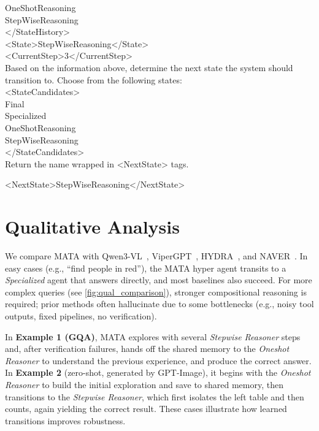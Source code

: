\documentclass{article} %
\newcommand{\revise}[1]{{#1}}
\newcommand{\methodname}{MATA}
\newcommand{\datasetname}{\methodname-SFT-90K}
\begin{document}
\begin{prompt}[title={Example \thetcbcounter: \datasetname{} Example Input}]
OneShotReasoning\\
StepWiseReasoning\\
</StateHistory>\\
<State>StepWiseReasoning</State>\\
<CurrentStep>3</CurrentStep>\\
Based on the information above, determine the next state the system should transition to. Choose from the following states:\\
<StateCandidates>\\
Final\\
Specialized\\
OneShotReasoning\\
StepWiseReasoning\\
</StateCandidates>\\
Return the name wrapped in <NextState> tags.
\end{prompt}

\begin{prompt}[title={Example \thetcbcounter: \datasetname{} Example Output}]
<NextState>StepWiseReasoning</NextState>
\end{prompt}

\section{\revise{Qualitative Analysis}}\label{sec:qual_analysis}

\revise{We compare \methodname{} with Qwen3-VL~\citep{bai_qwen3-vl_2025}, ViperGPT~\citep{suris_vipergpt_2023}, HYDRA~\citep{ke_hydra_2024}, and NAVER~\citep{cai_naver_2025}. In easy cases (e.g., ``find people in red''), the \methodname{} hyper agent transits to a \emph{Specialized} agent that answers directly, and most baselines also succeed. For more complex queries (see \autoref{fig:qual_comparison}), stronger compositional reasoning is required; prior methods often hallucinate due to some bottlenecks (e.g., noisy tool outputs, fixed pipelines, no verification).} 

\revise{In \textbf{Example 1 (GQA)}, \methodname{} explores with several \emph{Stepwise Reasoner} steps and, after verification failures, hands off the shared memory to the \emph{Oneshot Reasoner} to understand the previous experience, and produce the correct answer. In \textbf{Example 2} (zero-shot, generated by GPT-Image), it begins with the \emph{Oneshot Reasoner} to build the initial exploration and save to shared memory, then transitions to the \emph{Stepwise Reasoner}, which first isolates the left table and then counts, again yielding the correct result. These cases illustrate how learned transitions improves robustness.}
\end{document}
